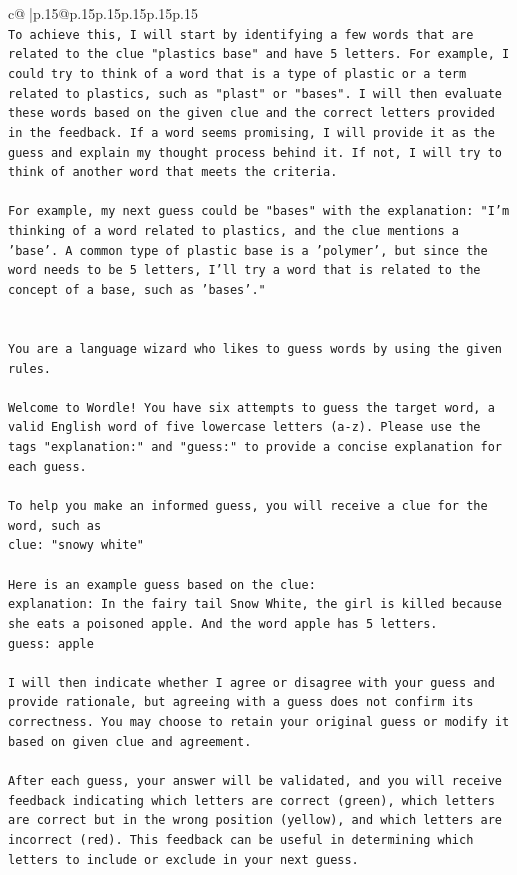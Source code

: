\documentclass{article}
\begin{document}
{\begin{supertabular}{c@{$\;$}|p{.15\linewidth}@{}p{.15\linewidth}p{.15\linewidth}p{.15\linewidth}p{.15\linewidth}p{.15\linewidth}}
{{{\\ 
\texttt{To achieve this, I will start by identifying a few words that are related to the clue "plastics base" and have 5 letters. For example, I could try to think of a word that is a type of plastic or a term related to plastics, such as "plast" or "bases". I will then evaluate these words based on the given clue and the correct letters provided in the feedback. If a word seems promising, I will provide it as the guess and explain my thought process behind it. If not, I will try to think of another word that meets the criteria. } \\
\\ 
\texttt{For example, my next guess could be "bases" with the explanation: "I'm thinking of a word related to plastics, and the clue mentions a 'base'. A common type of plastic base is a 'polymer', but since the word needs to be 5 letters, I'll try a word that is related to the concept of a base, such as 'bases'."} \\
\\ 
\\ 
\texttt{You are a language wizard who likes to guess words by using the given rules.} \\
\\ 
\texttt{Welcome to Wordle! You have six attempts to guess the target word, a valid English word of five lowercase letters (a{-}z). Please use the tags "explanation:" and "guess:" to provide a concise explanation for each guess.} \\
\\ 
\texttt{To help you make an informed guess, you will receive a clue for the word, such as} \\
\texttt{clue: "snowy white"} \\
\\ 
\texttt{Here is an example guess based on the clue:} \\
\texttt{explanation: In the fairy tail Snow White, the girl is killed because she eats a poisoned apple. And the word apple has 5 letters.} \\
\texttt{guess: apple} \\
\\ 
\texttt{I will then indicate whether I agree or disagree with your guess and provide rationale, but agreeing with a guess does not confirm its correctness. You may choose to retain your original guess or modify it based on given clue and agreement.} \\
\\ 
\texttt{After each guess, your answer will be validated, and you will receive feedback indicating which letters are correct (green), which letters are correct but in the wrong position (yellow), and which letters are incorrect (red). This feedback can be useful in determining which letters to include or exclude in your next guess.} \\
}}}
\end{supertabular}}
\end{document}
